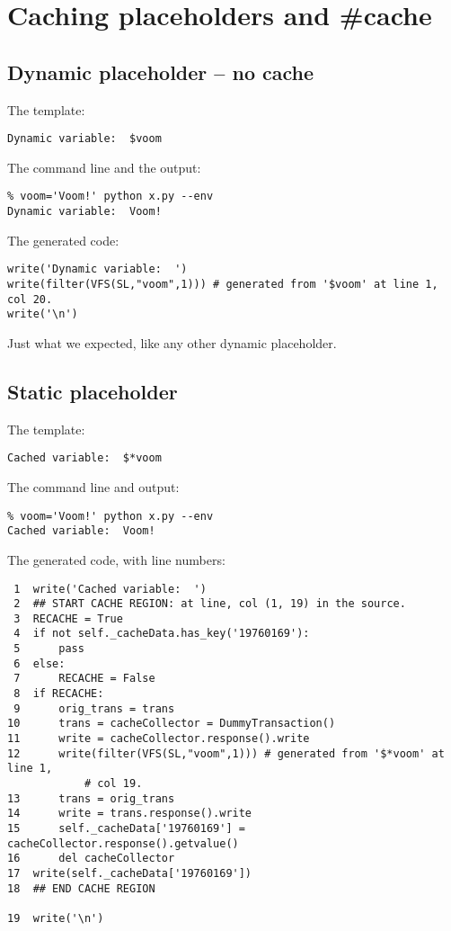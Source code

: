 \section{Caching placeholders and \#cache}
\label{cache}

\subsection{Dynamic placeholder -- no cache}
\label{cache.dynamic}

The template:
\begin{verbatim}
Dynamic variable:  $voom
\end{verbatim}

The command line and the output:
\begin{verbatim}
% voom='Voom!' python x.py --env
Dynamic variable:  Voom!
\end{verbatim}

The generated code:
\begin{verbatim}
write('Dynamic variable:  ')
write(filter(VFS(SL,"voom",1))) # generated from '$voom' at line 1, col 20.
write('\n')
\end{verbatim}

Just what we expected, like any other dynamic placeholder.

\subsection{Static placeholder}
\label{cache.static}

The template:
\begin{verbatim}
Cached variable:  $*voom
\end{verbatim}

The command line and output:
\begin{verbatim}
% voom='Voom!' python x.py --env
Cached variable:  Voom!
\end{verbatim}

The generated code, with line numbers:
\begin{verbatim}
 1  write('Cached variable:  ')
 2  ## START CACHE REGION: at line, col (1, 19) in the source.
 3  RECACHE = True
 4  if not self._cacheData.has_key('19760169'):
 5      pass
 6  else:
 7      RECACHE = False
 8  if RECACHE:
 9      orig_trans = trans
10      trans = cacheCollector = DummyTransaction()
11      write = cacheCollector.response().write
12      write(filter(VFS(SL,"voom",1))) # generated from '$*voom' at line 1,
            # col 19.
13      trans = orig_trans
14      write = trans.response().write
15      self._cacheData['19760169'] = cacheCollector.response().getvalue()
16      del cacheCollector
17  write(self._cacheData['19760169'])
18  ## END CACHE REGION
    
19  write('\n')
\end{verbatim}

